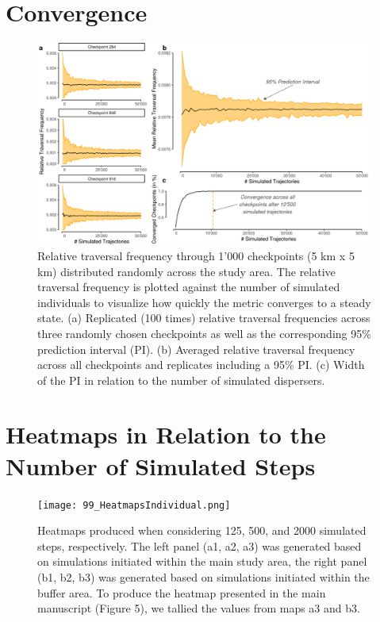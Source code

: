 \documentclass[abstract=off,10pt,a4paper,bibliography=totocnumbered]{article}
\begin{document}
\newpage
\section{Convergence}
\begin{figure}[htbp]
  \begin{center}
    \includegraphics[width=\textwidth]{99_Convergence}
    \caption{Relative traversal frequency through 1'000 checkpoints (5 km x 5
    km) distributed randomly across the study area. The relative traversal
    frequency is plotted against the number of simulated individuals to
    visualize how quickly the metric converges to a steady state. (a) Replicated
    (100 times) relative traversal frequencies across three randomly chosen
    checkpoints as well as the corresponding 95\% prediction interval (PI). (b)
    Averaged relative traversal frequency across all checkpoints and replicates
    including a 95\% PI. (c) Width of the PI in relation to the number of
    simulated dispersers.}
    \label{Convergence}
  \end{center}
\end{figure}

\newpage
{}
\section{Heatmaps in Relation to the Number of Simulated Steps}
\begin{figure}[hbtp]
 \begin{center}
  \texttt{[image: 99\_HeatmapsIndividual.png]}
  \caption{Heatmaps produced when considering 125, 500, and 2000 simulated
   steps, respectively. The left panel (a1, a2, a3) was generated based on
   simulations initiated within the main study area, the right panel (b1, b2,
   b3) was generated based on simulations initiated within the buffer area. To
   produce the heatmap presented in the main manuscript (Figure 5), we tallied
   the values from maps a3 and b3.}
  \label{Heatman}
 \end{center}
\end{figure}
\restoregeometry
\end{document}
